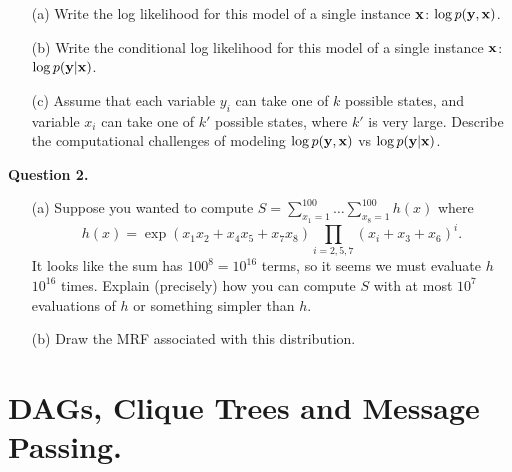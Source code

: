 \documentclass[11pt]{article}
\newcommand{\vx}{{\bf x}}
\newcommand{\vy}{{\bf y}}
\begin{document}
\begin{enumerate}
\item[(a)] Write the log likelihood for this model of a single instance $\vx$: $\log{p(\vy,\vx)}$. 

\item[(b)] Write the conditional log likelihood for this model of a single instance $\vx$: $\log{p(\vy|\vx)}$. 

\item[(c)] Assume that each variable $y_i$ can take one of $k$ possible states, and variable $x_i$ can take one of $k'$ possible states, where $k'$ is very large. Describe the computational challenges of modeling $\log p(\vy,\vx)$ vs $\log p(\vy|\vx)$.
\end{enumerate}

\begin{answertext}{8cm}{}
\end{answertext}

\newpage %
\begin{answertext}{8cm}{}
\end{answertext} 

{\bf Question 2.}

\begin{enumerate}
\item[(a)] Suppose you wanted to compute $S = \sum^{100}_{x_1 = 1} \dots \sum^{100}_{x_8 = 1} h(x)$ where
\begin{equation*}
    h(x) = \exp(x_1 x_2 + x_4 x_5 + x_7 x_8) \prod_{i=2,5,7} (x_i + x_3 + x_6)^i.
\end{equation*}
It looks like the sum has $100^8 = 10^{16}$ terms, so it seems we must evaluate $h$ $10^{16}$ times. Explain (precisely) how you can compute $S$ with at most $10^7$ evaluations of $h$ or something simpler than $h$.

\item[(b)] Draw the MRF associated with this distribution.
\end{enumerate}

\begin{answertext}{8cm}{}
\end{answertext} 

\pagebreak

\section*{DAGs, Clique Trees and Message Passing.}
\end{document}
